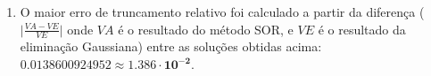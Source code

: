 \documentclass{article}
\newenvironment{arabenum}{
    \begin{enumerate}[label=\textbf{\arabic*})]
}{
    \end{enumerate}
}
\newenvironment{alphenum}{
    \begin{enumerate}[label=(\textit{\alph*})]
}{
    \end{enumerate}
}
\begin{document}
\begin{arabenum}
\begin{alphenum}
\begin{itemize}
\item Para subtrações, tem-se
\begin{equation*}
2 \cdot \sum_{i=1}^s \sum_{i}^n c = 2 \cdot c \cdot n \cdot s
\end{equation*}

\item Para multiplicações, tem-se
\begin{equation*}
\sum_{i=1}^s \sum_{i}^n c = c \cdot n \cdot s
\end{equation*}

\item Para divisões, tem-se
\begin{equation*}
\sum_{i=1}^s \sum_{i}^n c = c \cdot n \cdot s
\end{equation*}

\end{itemize}

Então, o número final de operações é de
\begin{equation*}
c \cdot s \cdot (7n - 4).
\end{equation*}

\item O maior erro de truncamento relativo foi calculado a partir da diferença
($\big\vert \frac{VA - VE}{VE} \big\vert$ onde $VA$ é o resultado do método SOR,
e $VE$ é o resultado da eliminação Gaussiana) entre as soluções obtidas acima:
$0.0138600924952 \approx \boldsymbol{1.386 \cdot 10^{-2}}$.

\end{alphenum}

\end{arabenum}
\end{document}
